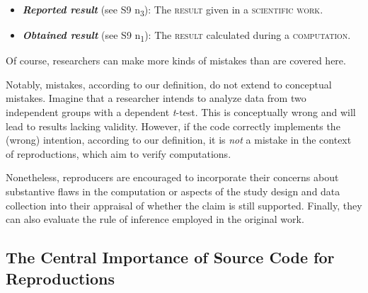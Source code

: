 \documentclass[authordate, meta]{jote-new-article}
\begin{document}
	\begin{itemize}[label=\phantom{\textbullet},topsep=0pt]
		\item \emph{\textbf{Reported result}} (see S9 \rightarrow{ }n\textsubscript{3}): The \textsc{result} given in a \textsc{scientific work}.

		\item \textbf{\emph{Obtained result}} (see S9 \rightarrow{ }n\textsubscript{1}): The \textsc{result} calculated during a \textsc{computation}.
	\end{itemize}
	\vspace{\topsep}
	


	


	Of course, researchers can make more kinds of mistakes than are covered here.


	Notably, mistakes, according to our definition, do not extend to conceptual mistakes. Imagine that a researcher intends to analyze data from two independent groups with a dependent \emph{t}-test. This is conceptually wrong and will lead to results lacking validity. However, if the code correctly implements the (wrong) intention, according to our definition, it is \emph{not} a mistake in the context of reproductions, which aim to verify computations.


	Nonetheless, reproducers are encouraged to incorporate their concerns about substantive flaws in the computation or aspects of the study design and data collection into their appraisal of whether the claim is still supported. Finally, they can also evaluate the rule of inference employed in the original work.


	


	\subsection{The Central Importance of Source Code for Reproductions}
\end{document}
